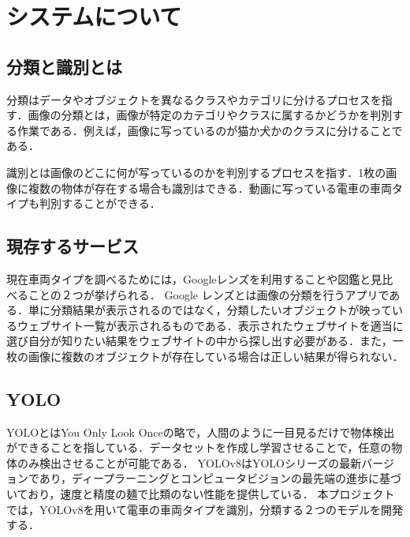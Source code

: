 

\chapter{システムについて}\label{system}
\section{分類と識別とは}
分類はデータやオブジェクトを異なるクラスやカテゴリに分けるプロセスを指す．画像の分類とは，画像が特定のカテゴリやクラスに属するかどうかを判別する作業である．例えば，画像に写っているのが猫か犬かのクラスに分けることである．

識別とは画像のどこに何が写っているのかを判別するプロセスを指す．1枚の画像に複数の物体が存在する場合も識別はできる．動画に写っている電車の車両タイプも判別することができる．



\section{現存するサービス}
現在車両タイプを調べるためには，Googleレンズを利用することや図鑑と見比べることの２つが挙げられる．
Google レンズとは画像の分類を行うアプリである．単に分類結果が表示されるのではなく，分類したいオブジェクトが映っているウェブサイト一覧が表示されるものである．表示されたウェブサイトを適当に選び自分が知りたい結果をウェブサイトの中から探し出す必要がある．また，一枚の画像に複数のオブジェクトが存在している場合は正しい結果が得られない．


\section{YOLO}
YOLOとはYou Only Look Onceの略で，人間のように一目見るだけで物体検出ができることを指している\cite{YOLO}．データセットを作成し学習させることで，任意の物体のみ検出させることが可能である．
YOLOv8はYOLOシリーズの最新バージョンであり，ディープラーニングとコンピュータビジョンの最先端の進歩に基づいており，速度と精度の麺で比類のない性能を提供している．
本プロジェクトでは，YOLOv8を用いて電車の車両タイプを識別，分類する２つのモデルを開発する．

